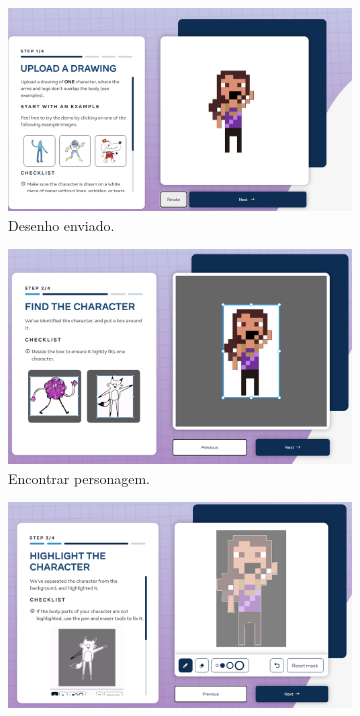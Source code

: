 \begin{figure}[htbp]
    \centering
    \caption{\small Processo da utilização 1 do Animated Drawnings}
    \label{fig:sketch1}
    \begin{subfigure}{0.45\linewidth}
        \includegraphics[width=1\linewidth]{figs/sketchLab/tela1.PNG}
        \caption{\small Desenho enviado.}
        \label{fig:sketch1a}
    \end{subfigure}
    \begin{subfigure}{0.45\linewidth}
        \centering
        \includegraphics[width=1\linewidth]{figs/sketchLab/tela2.PNG}
        \caption{\small Encontrar personagem.}
        \label{fig:sketch1b}
    \end{subfigure}
    \begin{subfigure}{0.45\linewidth}
        \centering
        \includegraphics[width=1\linewidth]{figs/sketchLab/tela3.PNG}

\end{subfigure}
\end{figure}
